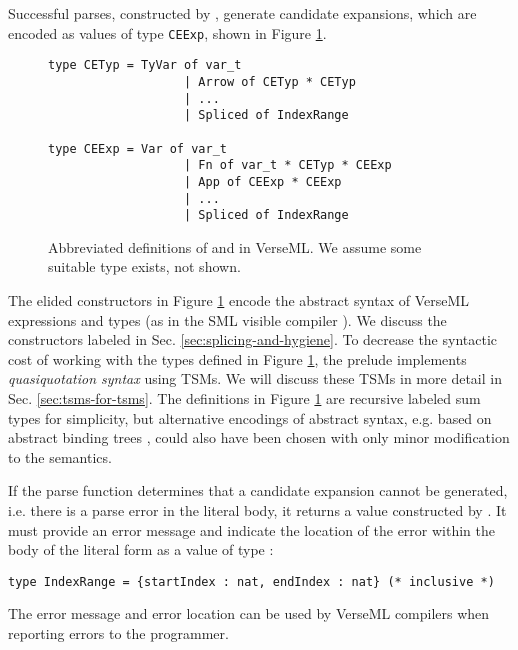Successful parses, constructed by , generate candidate expansions, which are encoded as values of type \lstinline{CEExp}, shown in Figure \ref{fig:candidate-exp-verseml}. 
\begin{figure}
\begin{lstlisting}[numbers=none]
type CETyp = TyVar of var_t 
                   | Arrow of CETyp * CETyp 
                   | ... 
                   | Spliced of IndexRange

type CEExp = Var of var_t 
                   | Fn of var_t * CETyp * CEExp
                   | App of CEExp * CEExp
                   | ... 
                   | Spliced of IndexRange
\end{lstlisting}
\caption[Abbreviated definitions of  and  in VerseML.]{Abbreviated definitions of  and  in VerseML. We assume some suitable type  exists, not shown.}
\label{fig:candidate-exp-verseml}
\end{figure}
The elided constructors in Figure \ref{fig:candidate-exp-verseml} encode the abstract syntax of VerseML expressions and types (as in the SML visible compiler \cite{SML/VisibleCompiler}).
We discuss the constructors labeled  in Sec. \ref{sec:splicing-and-hygiene}. To decrease the syntactic cost of working with the types defined in Figure \ref{fig:candidate-exp-verseml}, the prelude implements \emph{quasiquotation syntax} using TSMs. We will discuss these TSMs in more detail in Sec. \ref{sec:tsms-for-tsms}. The definitions in Figure \ref{fig:candidate-exp-verseml} are recursive labeled sum types for simplicity, but alternative encodings of abstract syntax, e.g. based on abstract binding trees \cite{pfpl}, could also have been chosen with only minor modification to the semantics. %

If the parse function determines that a candidate expansion cannot be generated, i.e. there is a parse error in the literal body, it returns a value constructed by . It must provide an error message and indicate the location of the error within the body of the literal form as a value of type :
\begin{lstlisting}[numbers=none]
type IndexRange = {startIndex : nat, endIndex : nat} (* inclusive *)
\end{lstlisting}
The error message and error location can be used by VerseML compilers when reporting errors to the programmer.

